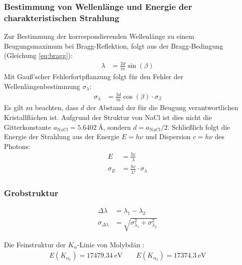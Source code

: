 \documentclass[10pt, a4paper]{article}
\begin{document}
\subsubsection{Bestimmung von Wellenlänge und Energie der charakteristischen Strahlung}
Zur Bestimmung der korrespondierenden Wellenlänge zu einem Beugungsmaximum bei Bragg-Reflektion, folgt aus der Bragg-Bedingung (Gleichung \ref{eq:bragg}):
\begin{align}
  \lambda &= \frac{2d}{m} \sin(\beta)
\end{align}
Mit Gauß'scher Fehlerfortpflanzung folgt für den Fehler der Wellenlängenbestimmung $\sigma_\lambda$:
\begin{align}
  \sigma_\lambda &= \frac{2d}{m} \cos(\beta) \cdot \sigma_\beta
\end{align}
Es gilt zu beachten, dass $d$ der Abstand der für die Beugung verantwortlichen Kristallflächen ist.
Aufgrund der Struktur von NaCl ist dies nicht die Gitterkonstante $a_\mathrm{NaCl} = \SI{5,6402}{\angstrom}$\cite{crc}, sondern $d = a_\mathrm{NaCl}/2 $.
Schließlich folgt die Energie der Strahlung aus der Energie $E = h\nu$ und Dispersion $ c = h \nu$ des Photons:
\begin{align}
  E &= \frac{h c}{\lambda} \\
  \sigma_E &= \frac{h c}{\lambda^2} \cdot \sigma_\lambda
\end{align}

\subsubsection{Grobstruktur}

\begin{table}[!h]
\centering

\caption{}
\label{tab:ausw_grob}
\end{table}

\begin{align}
  \Delta \lambda &= \lambda_1 - \lambda_2 \\
  \sigma_{\Delta \lambda} &= \sqrt{\sigma_{\lambda_1}^2 + \sigma_{\lambda_2}^2}
\end{align}




Die Feinstruktur der $K_\alpha$-Linie von Molybdän \cite{booklet}:
\begin{align*}
  E(K_{\alpha_1}) = \SI{17479,34}{\electronvolt} \qquad E(K_{\alpha_2}) = \SI{17374,3}{\electronvolt}
\end{align*}
\end{document}
